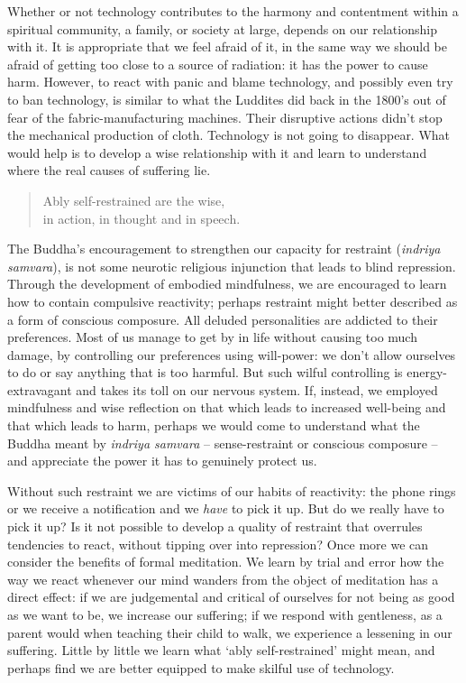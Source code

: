 Whether or not technology contributes to the harmony and contentment
within a spiritual community, a family, or society at large, depends on
our relationship with it. It is appropriate that we feel afraid of it,
in the same way we should be afraid of getting too close to a source of
radiation: it has the power to cause harm. However, to react with panic
and blame technology, and possibly even try to ban technology, is
similar to what the Luddites\cite{luddites}
did back in the 1800's out of fear of the fabric-manufacturing
machines. Their disruptive actions didn't stop the mechanical production
of cloth. Technology is not going to disappear. What would help is to
develop a wise relationship with it and learn to understand where the
real causes of suffering lie.

\enlargethispage{\baselineskip}

\begin{quote}
  Ably self-restrained are the wise,\\
  in action, in thought and in speech.

\end{quote}

The Buddha's encouragement to strengthen our capacity for restraint
(\emph{indriya samvara}), is not some neurotic religious injunction that
leads to blind repression. Through the development of embodied
mindfulness, we are encouraged to learn how to contain compulsive
reactivity; \mbox{perhaps} restraint might better described as a form of
conscious composure. All deluded personalities are addicted to their
preferences. Most of us manage to get by in life without causing too
much damage, by controlling our preferences using will-power: we don't
allow ourselves to do or say anything that is too harmful. But such
wilful controlling is energy-extravagant and takes its toll on our
nervous system. If, instead, we employed mindfulness and wise reflection
on that which leads to increased well-being and that which leads to
harm, perhaps we would come to understand what the Buddha meant by
\emph{indriya samvara} -- sense-restraint or conscious composure -- and
appreciate the power it has to genuinely protect us.

Without such restraint we are victims of our habits of reactivity: the
phone rings or we receive a notification and we \emph{have} to pick it
up. But do we really have to pick it up? Is it not possible to develop a
quality of restraint that overrules tendencies to react, without tipping
over into repression? Once more we can consider the benefits of formal
meditation. We learn by trial and error how the way we react whenever
our mind wanders from the object of meditation has a direct effect: if
we are judgemental and critical of ourselves for not being as good as we
want to be, we increase our suffering; if we respond with gentleness, as
a parent would when teaching their child to walk, we experience a
lessening in our suffering. Little by little we learn what `ably
self-restrained' might mean, and perhaps find we are better equipped to make
skilful use of technology.

